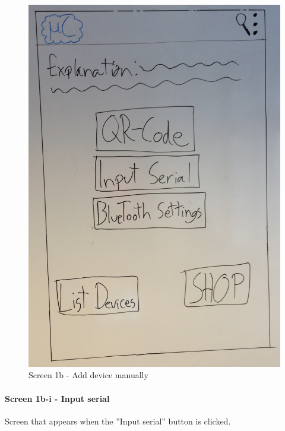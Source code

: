 \begin{figure}[H]
\centering
\includegraphics[scale=0.2]{images/Design_guide/Screen1b.png}
\caption{Screen 1b - Add device manually}
\end{figure}


\paragraph{Screen 1b-i - Input serial}
Screen that appears when the ''Input serial'' button is clicked.

